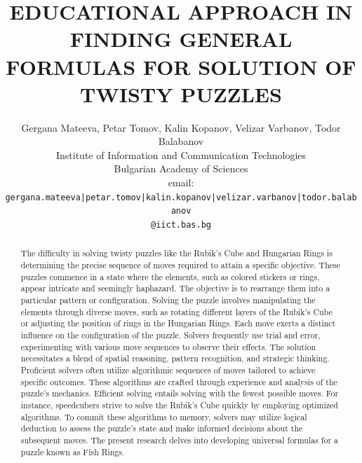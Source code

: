 \documentclass[a4paper,twocolumn,10pt]{article}
\begin{document}
\title{EDUCATIONAL APPROACH IN FINDING GENERAL FORMULAS FOR SOLUTION OF TWISTY PUZZLES}

\author{Gergana Mateeva, Petar Tomov, Kalin Kopanov, Velizar Varbanov, Todor Balabanov \\
Institute of Information and Communication Technologies \\
Bulgarian Academy of Sciences \\
email: \texttt{gergana.mateeva|petar.tomov|kalin.kopanov|velizar.varbanov|todor.balabanov} \\ 
\texttt{@iict.bas.bg}}

\date{}

\maketitle

\thispagestyle{empty}


\begin{abstract}
The difficulty in solving twisty puzzles like the Rubik's Cube and Hungarian Rings is determining the precise sequence of moves required to attain a specific objective. These puzzles commence in a state where the elements, such as colored stickers or rings, appear intricate and seemingly haphazard. The objective is to rearrange them into a particular pattern or configuration. Solving the puzzle involves manipulating the elements through diverse moves, such as rotating different layers of the Rubik's Cube or adjusting the position of rings in the Hungarian Rings. Each move exerts a distinct influence on the configuration of the puzzle. Solvers frequently use trial and error, experimenting with various move sequences to observe their effects. The solution necessitates a blend of spatial reasoning, pattern recognition, and strategic thinking. Proficient solvers often utilize algorithmic sequences of moves tailored to achieve specific outcomes. These algorithms are crafted through experience and analysis of the puzzle's mechanics. Efficient solving entails solving with the fewest possible moves. For instance, speedcubers strive to solve the Rubik's Cube quickly by employing optimized algorithms. To commit these algorithms to memory, solvers may utilize logical deduction to assess the puzzle's state and make informed decisions about the subsequent moves. The present research delves into developing universal formulas for a puzzle known as Fish Rings.
\end{abstract}
\end{document}
